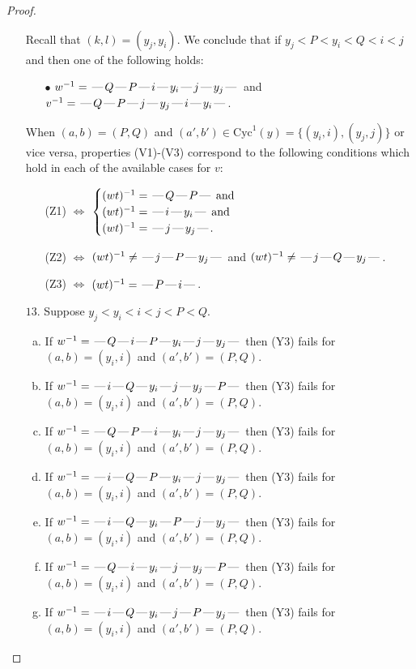 \documentclass[10pt]{article}
\theoremstyle{definition}
\theoremstyle{definition}
\def\dash{\text{\hspace{0.5mm}---\hspace{0.5mm}}}
\def\Cyc{\mathrm{Cyc}}
\begin{document}
\begin{proof}
\begin{enumerate}
Recall that $(k,l) = (y_j,y_i)$.
We conclude that if $y_j < P < y_i < Q < i < j$ and then one of the following holds:
\begin{enumerate}
\item[$\bullet$] $w^{-1} = \dash Q\dash P\dash i\dash y_i\dash j\dash y_j\dash $ and $v^{-1} = \dash Q\dash P\dash j\dash y_j\dash i\dash y_i\dash $.
\end{enumerate}
When $(a,b)= (P,Q)$ and $(a',b')\in \Cyc^1(y)=\{(y_i,i),(y_j,j)\}$ or vice versa,
properties (V1)-(V3) correspond to the following conditions which hold in
each of the available cases for $v$:
\begin{enumerate}
\item[](Z1) $\Leftrightarrow$ $\begin{cases}\text{$(wt)^{-1} = \dash Q \dash P \dash$}\text{ and }\\
\text{$(wt)^{-1} = \dash i \dash y_i \dash$}\text{ and }\\
\text{$(wt)^{-1} = \dash j \dash y_j \dash$}.\end{cases}$
\item[](Z2) $\Leftrightarrow$ $(wt)^{-1} \neq \dash j \dash P \dash y_j \dash$ and $(wt)^{-1}\neq \dash j \dash Q \dash y_j \dash$.
\item[](Z3) $\Leftrightarrow$ $(wt)^{-1} = \dash P \dash i \dash$.
\end{enumerate}
\item[$13$.] Suppose $y_j < y_i < i < j < P < Q$.
\begin{enumerate}[(a)]
\item If $w^{-1} = \dash Q\dash i\dash P\dash y_i\dash j\dash y_j\dash $ then (Y3) fails for $(a,b)=(y_i,i)$ and $(a',b')=(P,Q)$.
\item If $w^{-1} = \dash i\dash Q\dash y_i\dash j\dash y_j\dash P\dash $ then (Y3) fails for $(a,b)=(y_i,i)$ and $(a',b')=(P,Q)$.
\item If $w^{-1} = \dash Q\dash P\dash i\dash y_i\dash j\dash y_j\dash $ then (Y3) fails for $(a,b)=(y_i,i)$ and $(a',b')=(P,Q)$.
\item If $w^{-1} = \dash i\dash Q\dash P\dash y_i\dash j\dash y_j\dash $ then (Y3) fails for $(a,b)=(y_i,i)$ and $(a',b')=(P,Q)$.
\item If $w^{-1} = \dash i\dash Q\dash y_i\dash P\dash j\dash y_j\dash $ then (Y3) fails for $(a,b)=(y_i,i)$ and $(a',b')=(P,Q)$.
\item If $w^{-1} = \dash Q\dash i\dash y_i\dash j\dash y_j\dash P\dash $ then (Y3) fails for $(a,b)=(y_i,i)$ and $(a',b')=(P,Q)$.
\item If $w^{-1} = \dash i\dash Q\dash y_i\dash j\dash P\dash y_j\dash $ then (Y3) fails for $(a,b)=(y_i,i)$ and $(a',b')=(P,Q)$.

\end{enumerate}
\end{enumerate}
\end{proof}
\end{document}
